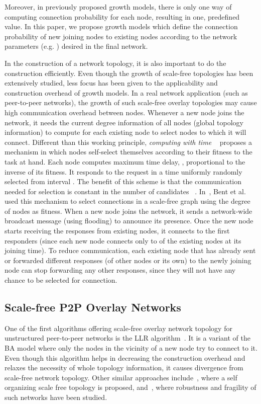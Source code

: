 \documentclass[10pt,journal,cspaper,compsoc]{IEEEtran}
\begin{document}
Moreover, in previously proposed growth models, there is only one way of computing connection probability for each node, resulting in one, predefined  value. In this paper, we propose growth models which define the connection probability of new joining nodes to existing nodes according to the network parameters (e.g. ) desired in the final network.

In the construction of a network topology, it is also important to do the construction efficiently. Even though the growth of scale-free topologies has been extensively studied, less focus has been given to the applicability and construction overhead of growth models. In a real network application (such as peer-to-peer networks), the growth of such scale-free overlay topologies may cause high communication overhead between nodes. Whenever a new node joins the network, it needs the current degree information of all nodes (global topology information) to compute  for each existing node  to select nodes to which it will connect. 
Different than this working principle, {\it computing with time} ~\cite{computer-bks} proposes a mechanism in which nodes self-select themselves according to their fitness to the task at hand. Each node computes maximum time delay, , proportional to the inverse of its fitness. It responds to the request in a time uniformly randomly selected from interval . The benefit of this scheme is that the communication needed for selection is constant in the number of candidates ~\cite{computer-bks}. In~\cite{gaian-dynamic}, Bent et al. used this mechanism to select connections in a scale-free graph using the degree of nodes as fitness. When a new node joins the network, it sends a network-wide broadcast message (using flooding) to announce its presence. Once the new node starts receiving the responses from existing nodes, it connects to the first  responders (since each new node connects only to  of the existing nodes at its joining time). To reduce communication, each existing node that has already sent or forwarded  different responses (of other nodes or its own) to the newly joining node can stop forwarding any other responses, since they will not have any chance to be selected for connection. 


\subsection{Scale-free P2P Overlay Networks}

One of the first algorithms offering scale-free overlay network topology for unstructured peer-to-peer networks is the LLR algorithm~\cite{llr}. It is a variant of the BA model where only the nodes in the vicinity of a new node try to connect to it. Even though this algorithm helps in decreasing the construction overhead and relaxes the necessity of whole topology information, it causes divergence from scale-free network topology. Other similar approaches include~\cite{self}, where a self organizing scale free topology is proposed, and~\cite{overlay}, where robustness and fragility of such networks have been studied.
\end{document}
